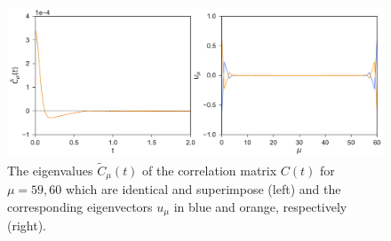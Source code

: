 \documentclass[a4paper,openright,12pt]{book}
\begin{document}
\begin{figure}[h!]
  \centering
\includegraphics[scale=0.45]{EigenvaluesVectors-WALLS-66nodes}
\caption[Eigenvalues and eigenvectors near the walls for 66 nodes.]{The eigenvalues $\tilde{C}_{\mu}(t)$ of the correlation matrix $C(t)$ for $\mu=59,60$ which are identical and superimpose (left) and the corresponding eigenvectors $u_{\mu}$ in blue and orange, respectively (right).}
\label{fig:EigenvaluesVectors-WALLS-66nodes}
\end{figure}
\end{document}
